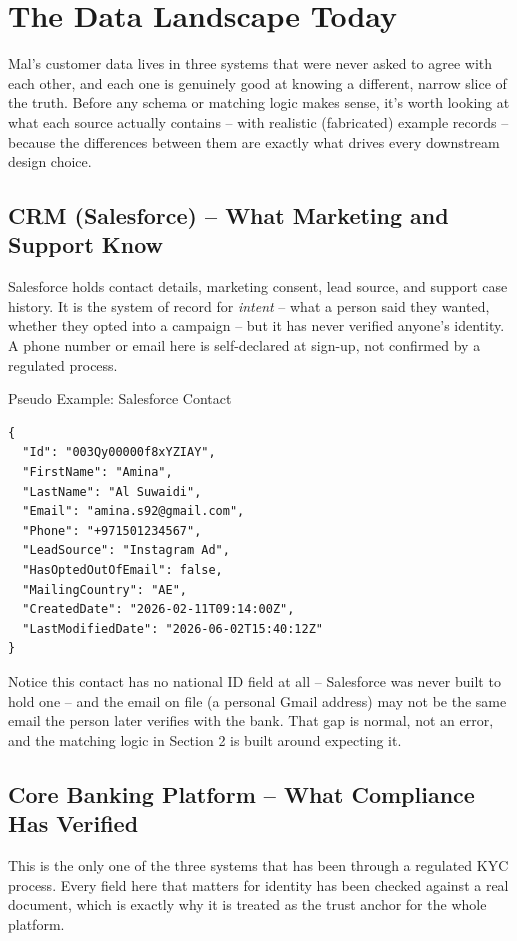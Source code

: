 \documentclass[11pt]{article}
\begin{document}
\section{The Data Landscape Today}
Mal's customer data lives in three systems that were never asked to agree with each other, and each one is genuinely good at knowing a different, narrow slice of the truth. Before any schema or matching logic makes sense, it's worth looking at what each source actually contains -- with realistic (fabricated) example records -- because the differences between them are exactly what drives every downstream design choice.

\subsection{CRM (Salesforce) -- What Marketing and Support Know}
Salesforce holds contact details, marketing consent, lead source, and support case history. It is the system of record for \emph{intent} -- what a person said they wanted, whether they opted into a campaign -- but it has never verified anyone's identity. A phone number or email here is self-declared at sign-up, not confirmed by a regulated process.

\begin{datarecord}{Pseudo Example: Salesforce Contact}
\begin{lstlisting}[basicstyle=\ttfamily\scriptsize\color{malcodetext}]
{
  "Id": "003Qy00000f8xYZIAY",
  "FirstName": "Amina",
  "LastName": "Al Suwaidi",
  "Email": "amina.s92@gmail.com",
  "Phone": "+971501234567",
  "LeadSource": "Instagram Ad",
  "HasOptedOutOfEmail": false,
  "MailingCountry": "AE",
  "CreatedDate": "2026-02-11T09:14:00Z",
  "LastModifiedDate": "2026-06-02T15:40:12Z"
}
\end{lstlisting}
\end{datarecord}

Notice this contact has no national ID field at all -- Salesforce was never built to hold one -- and the email on file (a personal Gmail address) may not be the same email the person later verifies with the bank. That gap is normal, not an error, and the matching logic in Section 2 is built around expecting it.

\subsection{Core Banking Platform -- What Compliance Has Verified}
This is the only one of the three systems that has been through a regulated KYC process. Every field here that matters for identity has been checked against a real document, which is exactly why it is treated as the trust anchor for the whole platform.
\end{document}
